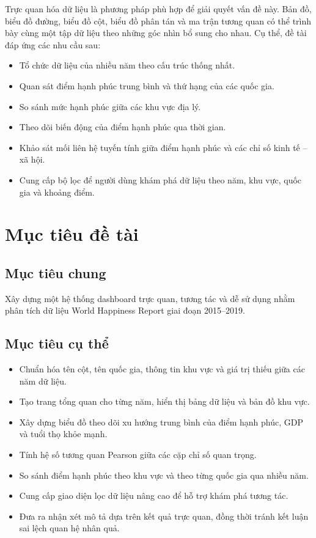 Trực quan hóa dữ liệu là phương pháp phù hợp để giải quyết vấn đề này. Bản đồ, biểu đồ đường, biểu đồ cột, biểu đồ phân tán và ma trận tương quan có thể trình bày cùng một tập dữ liệu theo những góc nhìn bổ sung cho nhau. Cụ thể, đề tài đáp ứng các nhu cầu sau:

\begin{itemize}
    \item Tổ chức dữ liệu của nhiều năm theo cấu trúc thống nhất.
    \item Quan sát điểm hạnh phúc trung bình và thứ hạng của các quốc gia.
    \item So sánh mức hạnh phúc giữa các khu vực địa lý.
    \item Theo dõi biến động của điểm hạnh phúc qua thời gian.
    \item Khảo sát mối liên hệ tuyến tính giữa điểm hạnh phúc và các chỉ số kinh tế -- xã hội.
    \item Cung cấp bộ lọc để người dùng khám phá dữ liệu theo năm, khu vực, quốc gia và khoảng điểm.
\end{itemize}

\section{Mục tiêu đề tài}

\subsection{Mục tiêu chung}

Xây dựng một hệ thống dashboard trực quan, tương tác và dễ sử dụng nhằm phân tích dữ liệu World Happiness Report giai đoạn 2015--2019.

\subsection{Mục tiêu cụ thể}

\begin{itemize}
    \item Chuẩn hóa tên cột, tên quốc gia, thông tin khu vực và giá trị thiếu giữa các năm dữ liệu.
    \item Tạo trang tổng quan cho từng năm, hiển thị bảng dữ liệu và bản đồ khu vực.
    \item Xây dựng biểu đồ theo dõi xu hướng trung bình của điểm hạnh phúc, GDP và tuổi thọ khỏe mạnh.
    \item Tính hệ số tương quan Pearson giữa các cặp chỉ số quan trọng.
    \item So sánh điểm hạnh phúc theo khu vực và theo từng quốc gia qua nhiều năm.
    \item Cung cấp giao diện lọc dữ liệu nâng cao để hỗ trợ khám phá tương tác.
    \item Đưa ra nhận xét mô tả dựa trên kết quả trực quan, đồng thời tránh kết luận sai lệch quan hệ nhân quả.
\end{itemize}

